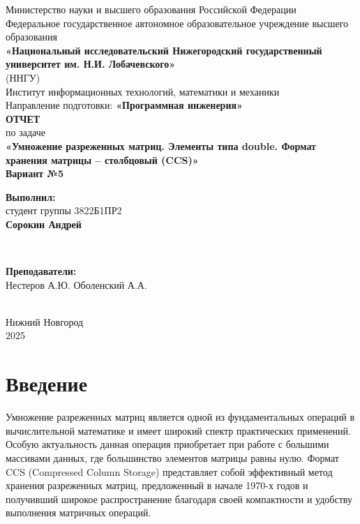 \documentclass[12pt]{article}
\begin{document}
\begin{titlepage}
    \centering
    \large
    Министерство науки и высшего образования Российской Федерации\\[0.5cm]
    Федеральное государственное автономное образовательное учреждение высшего образования\\[0.5cm]
    \textbf{«Национальный исследовательский Нижегородский государственный университет им. Н.И. Лобачевского»}\\
    (ННГУ)\\[1cm]
    Институт информационных технологий, математики и механики\\[0.5cm]
    Направление подготовки: \textbf{«Программная инженерия»}\\[2cm]

    \vfill
    {\LARGE \textbf{ОТЧЕТ}}\\[0.5cm]
    {\Large по задаче}\\[0.5cm]
    {\LARGE \textbf{«Умножение разреженных матриц. Элементы типа double. Формат хранения матрицы – столбцовый (CCS)»}}\\[0.5cm]
    {\Large \textbf{Вариант №5}}\\[2.5cm]

    \hfill\parbox{0.5\textwidth}{
        \textbf{Выполнил:} \\
        студент группы 3822Б1ПР2 \\
        \textbf{Сорокин Андрей}
    }\\[0.5cm]

    \hfill\parbox{0.5\textwidth}{
        \textbf{Преподаватели:} \\
        Нестеров А.Ю.
        Оболенский А.А.
        
    }\\[2cm]

    Нижний Новгород\\
    2025
\end{titlepage}


\thispagestyle{empty}
\clearpage
{} 
\setcounter{page}{2} 
\tableofcontents
\clearpage
\setcounter{page}{3} 
\section{Введение}

\hspace*{1.25em}Умножение разреженных матриц является одной из фундаментальных операций в вычислительной математике и имеет широкий спектр практических применений. Особую актуальность данная операция приобретает при работе с большими массивами данных, где большинство элементов матрицы равны нулю. Формат CCS (Compressed Column Storage) представляет собой эффективный метод хранения разреженных матриц, предложенный в начале 1970-х годов и получивший широкое распространение благодаря своей компактности и удобству выполнения матричных операций.
\end{document}
